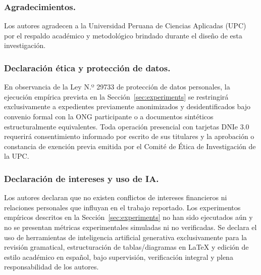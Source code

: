 \documentclass[runningheads,twocolumn]{llncs}
\def\ackname{Agradecimientos.}%
\def\ethicsname{Declaración ética y protección de datos.}%
\def\discintname{Declaración de intereses y uso de IA.}%
\begin{document}
\begin{credits}
\subsubsection{\ackname}
Los autores agradecen a la Universidad Peruana de Ciencias Aplicadas (UPC) por el respaldo académico y metodológico brindado durante el diseño de esta investigación.

\subsubsection{\ethicsname}
En observancia de la Ley N.º 29733 \cite{ley29733} de protección de datos personales, la ejecución empírica prevista en la Sección~\ref{sec:experiments} se restringirá exclusivamente a expedientes previamente anonimizados y desidentificados bajo convenio formal con la ONG participante o a documentos sintéticos estructuralmente equivalentes. Toda operación presencial con tarjetas DNIe 3.0 requerirá consentimiento informado por escrito de sus titulares y la aprobación o constancia de exención previa emitida por el Comité de Ética de Investigación de la UPC.

\subsubsection{\discintname}
Los autores declaran que no existen conflictos de intereses financieros ni relaciones personales que influyan en el trabajo reportado. Los experimentos empíricos descritos en la Sección~\ref{sec:experiments} no han sido ejecutados aún y no se presentan métricas experimentales simuladas ni no verificadas. Se declara el uso de herramientas de inteligencia artificial generativa exclusivamente para la revisión gramatical, estructuración de tablas/diagramas en \LaTeX{} y edición de estilo académico en español, bajo supervisión, verificación integral y plena responsabilidad de los autores.
\end{credits}



\end{document}
